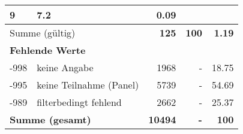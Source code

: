 \begin{longtable}{lXrrr}
       \num{9} &
       \num[round-mode=places,round-precision=2]{7,2} &
         \num[round-mode=places,round-precision=2]{0,09} \\
     \midrule
     \multicolumn{2}{l}{Summe (gültig)} &
       \textbf{\num{125}} &
     \textbf{100} &
       \textbf{\num[round-mode=places,round-precision=2]{1,19}} \\
     \multicolumn{5}{l}{\textbf{Fehlende Werte}}\\
       -998 &
       keine Angabe &
         \num{1968} &
        - &
         \num[round-mode=places,round-precision=2]{18,75} \\
       -995 &
       keine Teilnahme (Panel) &
         \num{5739} &
        - &
         \num[round-mode=places,round-precision=2]{54,69} \\
       -989 &
       filterbedingt fehlend &
         \num{2662} &
        - &
         \num[round-mode=places,round-precision=2]{25,37} \\
     \midrule
     \multicolumn{2}{l}{\textbf{Summe (gesamt)}} &
          \textbf{\num{10494}} &
        \textbf{-} &
        \textbf{100} \\
     \bottomrule
     \end{longtable}
     
